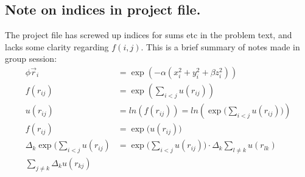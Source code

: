 \documentclass[12pt]{article}
\begin{document}
\subsection{Note on indices in project file.}
The project file has screwed up indices for sums etc in the problem text,
and lacks some clarity regarding $f(i,j)$. This is a brief summary of notes made
in group session:
\begin{align*}
	\phi{\vec{r}_i} &= \exp(-\alpha(x^{2}_i + y^{2}_i + \beta z^{2}_i))\\
	f(r_{ij}) &= \exp(\sum_{i<j}u(r_{ij})) \\
	u(r_{ij}) &= ln(f(r_{ij})) = ln(\exp\big(\sum_{i<j}u(r_{ij})\big)) \\
	f(r_{ij}) &= \exp\big(u(r_{ij})\big) \\
	\Delta_k \exp\big(\sum_{i<j} u(r_{ij}) &= \exp\big(\sum_{i<j} u(r_{ij})\big) \cdot 
	\Delta_k \sum_{l\neq k} u(r_{lk}) \\
	\sum_{j\neq k} \Delta_k u(r_{kj})
\end{align*}
\end{document}
